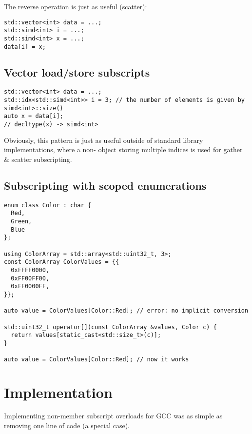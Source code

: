 The reverse operation is just as useful (scatter):
\smallskip\begin{lstlisting}
std::vector<int> data = ...;
std::simd<int> i = ...;
std::simd<int> x = ...;
data[i] = x;
\end{lstlisting}

\subsection{Vector load/store subscripts}
\begin{lstlisting}[morekeywords={[5]idx}]
std::vector<int> data = ...;
std::idx<std::simd<int>> i = 3; // the number of elements is given by simd<int>::size()
auto x = data[i];
// decltype(x) -> simd<int>
\end{lstlisting}


Obviously, this pattern is just as useful outside of standard library implementations, where a non- object storing multiple indices is used for gather \& scatter subscripting.

\subsection{Subscripting with scoped enumerations}

\begin{lstlisting}[style=Vc]
enum class Color : char {
  Red,
  Green,
  Blue
};

using ColorArray = std::array<std::uint32_t, 3>;
const ColorArray ColorValues = {{
  0xFFFF0000,
  0xFF00FF00,
  0xFF0000FF,
}};

auto value = ColorValues[Color::Red]; // error: no implicit conversion

std::uint32_t operator[](const ColorArray &values, Color c) {
  return values[static_cast<std::size_t>(c)];
}

auto value = ColorValues[Color::Red]; // now it works
\end{lstlisting}

\section{Implementation}
Implementing non-member subscript overloads for GCC was as simple as removing one line of code (a special case).

